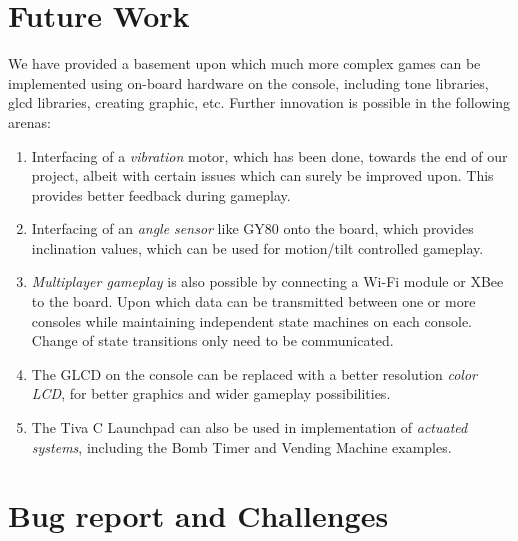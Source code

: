 \documentclass[a4paper,12pt,oneside]{book}
\begin{document}
\chapter{Future Work}
\qquad We have provided a basement upon which much more complex games can be implemented using on-board hardware on the console, including tone libraries, glcd libraries, creating graphic, etc. Further innovation is possible in the following arenas:
\begin{enumerate}
\item Interfacing of a \textit{vibration} motor, which has been done, towards the end of our project, albeit with certain issues which can surely be improved upon. This provides better feedback during gameplay.
\item Interfacing of an \textit{angle sensor} like GY80 onto the board, which provides inclination values, which can be used for motion/tilt controlled gameplay.
\item \textit{Multiplayer gameplay} is also possible by connecting a Wi-Fi module or XBee to the board. Upon which data can be transmitted between one or more consoles while maintaining independent state machines on each console. Change of state transitions only need to be communicated.
\item The GLCD on the console can be replaced with a better resolution \textit{color LCD}, for better graphics and wider gameplay possibilities.
\item The Tiva C Launchpad can also be used in implementation of \textit{actuated systems}, including the Bomb Timer and Vending Machine examples.
\end{enumerate}

\chapter{Bug report and Challenges}
\end{document}
